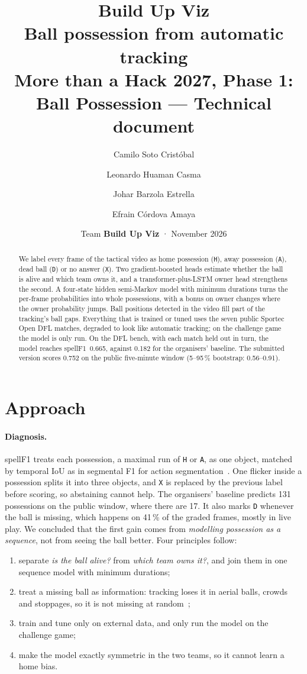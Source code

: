 \documentclass[11pt,a4paper]{article}
\title{\textbf{Build Up Viz}\\[4pt]
  \large Ball possession from automatic tracking\\[2pt]
  \normalsize More than a Hack 2027, Phase 1: Ball Possession --- Technical document}
\author{Camilo Soto Cristóbal \and Leonardo Huaman Casma \and Johar Barzola Estrella \and Efrain Córdova Amaya}
\date{Team \textbf{Build Up Viz} \quad·\quad 17 November 2026}
\newcommand{\code}[1]{\texttt{#1}}
\begin{document}
\maketitle

\begin{abstract}
\noindent
We label every frame of the tactical video as home possession (\code{H}), away possession (\code{A}),
dead ball (\code{D}) or no answer (\code{X}). Two gradient-boosted heads estimate whether the ball is
alive and which team owns it, and a transformer-plus-LSTM owner head strengthens the second. A
four-state hidden semi-Markov model with minimum durations turns the per-frame probabilities into
whole possessions, with a bonus on owner changes where the owner probability jumps. Ball positions
detected in the video fill part of the tracking's ball gaps.
Everything that is trained or tuned uses the seven public Sportec Open DFL matches, degraded to look
like automatic tracking; on the challenge game the model is only run. On the DFL bench, with each
match held out in turn, the model reaches spellF1~0.665, against 0.182 for the organisers' baseline.
The submitted version scores 0.752 on the public five-minute window (5--95\,\% bootstrap: 0.56--0.91).
\end{abstract}

\section{Approach}

\paragraph{Diagnosis.} spellF1 treats each possession, a maximal run of \code{H} or \code{A}, as one
object, matched by temporal IoU as in segmental F1 for action segmentation~\cite{lea2017tcn}. One
flicker inside a possession splits it into three objects, and \code{X} is replaced by the previous
label before scoring, so abstaining cannot help. The organisers' baseline predicts 131 possessions
on the public window, where there are 17. It also marks \code{D} whenever the ball is missing, which
happens on 41\,\% of the graded frames, mostly in live play. We concluded that the first gain comes
from \emph{modelling possession as a sequence}, not from seeing the ball better. Four principles
follow:
\begin{enumerate}
  \item separate \emph{is the ball alive?} from \emph{which team owns it?}, and join them in one
    sequence model with minimum durations;
  \item treat a missing ball as information: tracking loses it in aerial balls, crowds and
    stoppages, so it is not missing at random~\cite{rubin1976};
  \item train and tune only on external data, and only run the model on the challenge game;
  \item make the model exactly symmetric in the two teams, so it cannot learn a home bias.
\end{enumerate}
\end{document}
